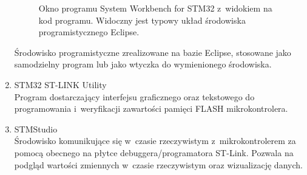 \begin{enumerate}
\begin{figure}[h!]
		\caption{Okno programu System Workbench for STM32 z~widokiem na kod programu. Widoczny jest typowy układ środowiska programistycznego Eclipse.}
		\label{fig:sw4stm}
	\end{figure}
	Środowisko programistyczne zrealizowane na bazie Eclipse, stosowane jako samodzielny program lub jako wtyczka do wymienionego środowiska.
	\item STM32 ST-LINK Utility\\
	Program dostarczający interfejsu graficznego oraz tekstowego do programowania i~weryfikacji zawartości pamięci FLASH mikrokontrolera.
	\item STMStudio\\
	Środowisko komunikujące się w~czasie rzeczywistym z~mikrokontrolerem za pomocą obecnego na płytce debuggera/programatora ST-Link. Pozwala na podgląd wartości zmiennych w~czasie rzeczywistym oraz wizualizację danych.
\end{enumerate}	